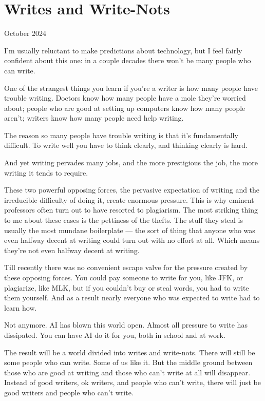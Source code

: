 \chapter{Writes and Write-Nots}

October 2024

I'm usually reluctant to make predictions about technology, but I feel
fairly confident about this one: in a couple decades there won't be many
people who can write.

One of the strangest things you learn if you're a writer is how many
people have trouble writing. Doctors know how many people have a mole
they're worried about; people who are good at setting up computers know
how many people aren't; writers know how many people need help writing.

The reason so many people have trouble writing is that it's
fundamentally difficult. To write well you have to think clearly, and
thinking clearly is hard.

And yet writing pervades many jobs, and the more prestigious the job,
the more writing it tends to require.

These two powerful opposing forces, the pervasive expectation of writing
and the irreducible difficulty of doing it, create enormous pressure.
This is why eminent professors often turn out to have resorted to
plagiarism. The most striking thing to me about these cases is the
pettiness of the thefts. The stuff they steal is usually the most
mundane boilerplate --- the sort of thing that anyone who was even
halfway decent at writing could turn out with no effort at all. Which
means they're not even halfway decent at writing.

Till recently there was no convenient escape valve for the pressure
created by these opposing forces. You could pay someone to write for
you, like JFK, or plagiarize, like MLK, but if you couldn't buy or steal
words, you had to write them yourself. And as a result nearly everyone
who was expected to write had to learn how.

Not anymore. AI has blown this world open. Almost all pressure to write
has dissipated. You can have AI do it for you, both in school and at
work.

The result will be a world divided into writes and write-nots. There
will still be some people who can write. Some of us like it. But the
middle ground between those who are good at writing and those who can't
write at all will disappear. Instead of good writers, ok writers, and
people who can't write, there will just be good writers and people who
can't write.

